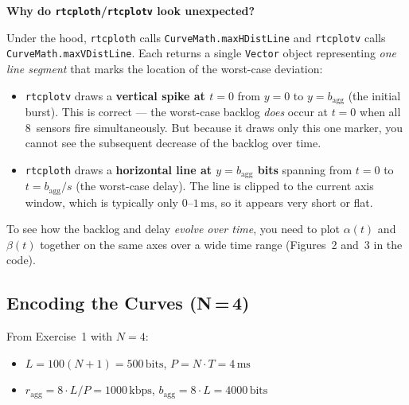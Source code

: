 \documentclass[12pt, a4paper]{article}
\begin{document}
\begin{warnbox}
  \textbf{Why do \texttt{rtcploth}/\texttt{rtcplotv} look unexpected?}

  Under the hood, \texttt{rtcploth} calls \texttt{CurveMath.maxHDistLine}
  and \texttt{rtcplotv} calls \texttt{CurveMath.maxVDistLine}.
  Each returns a single \texttt{Vector} object representing \emph{one line
  segment} that marks the location of the worst-case deviation:

  \begin{itemize}[leftmargin=1.2em, itemsep=3pt]
    \item \texttt{rtcplotv} draws a \textbf{vertical spike at $t=0$} from
      $y=0$ to $y = b_\text{agg}$ (the initial burst).
      This is correct --- the worst-case backlog \emph{does} occur at
      $t=0$ when all 8~sensors fire simultaneously.
      But because it draws only this one marker, you cannot see the
      subsequent decrease of the backlog over time.

    \item \texttt{rtcploth} draws a \textbf{horizontal line at
      $y = b_\text{agg}$ bits} spanning from $t=0$ to
      $t = b_\text{agg}/s$ (the worst-case delay).
      The line is clipped to the current axis window, which is typically
      only $0$--$1\,\text{ms}$, so it appears very short or flat.
  \end{itemize}

  To see how the backlog and delay \emph{evolve over time}, you need to
  plot $\alpha(t)$ and $\beta(t)$ together on the same axes over a
  wide time range (Figures~2 and~3 in the code).
\end{warnbox}

\subsection*{Encoding the Curves (N\,=\,4)}

From Exercise~1 with $N = 4$:
\begin{itemize}[leftmargin=1.4em, itemsep=2pt]
  \item $L = 100(N+1) = 500\,\text{bits}$, \quad $P = N \cdot T = 4\,\text{ms}$
  \item $r_\text{agg} = 8 \cdot L/P = 1000\,\text{kbps}$, \quad
        $b_\text{agg} = 8 \cdot L = 4000\,\text{bits}$
\end{itemize}
\end{document}
